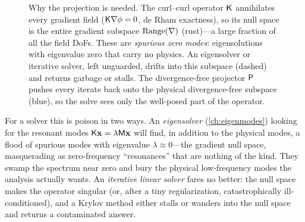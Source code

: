 \begin{figure}[t]
\centering
{}
\caption[The curl--curl gradient null space]{Why the projection is needed. The
curl--curl operator $\mathsf{K}$ annihilates every gradient field
($\mathsf{K}\nabla\phi=0$, de Rham exactness), so its null space is the entire
gradient subspace $\mathrm{Range}(\nabla)$ (rust)---a large fraction of all the
field DoFs. These are \emph{spurious zero modes}: eigensolutions with eigenvalue
zero that carry no physics. An eigensolver or iterative solver, left unguarded,
drifts into this subspace (dashed) and returns garbage or stalls. The
divergence-free projector $\mathsf{P}$ pushes every iterate back onto the physical
divergence-free subspace (blue), so the solve sees only the well-posed part of the
operator.}
\label{fig:nullspace}
\end{figure}

For a solver this is poison in two ways. An \emph{eigensolver}
(\cref{ch:eigenmodes}) looking for the resonant modes
$\mathsf{K}\mathbf{x}=\lambda\mathsf{M}\mathbf{x}$ will find, in addition to the physical modes, a
flood of spurious modes with eigenvalue $\lambda\approx 0$---the gradient null
space, masquerading as zero-frequency ``resonances'' that are nothing of the kind.
They swamp the spectrum near zero and bury the physical low-frequency modes the
analysis actually wants. An \emph{iterative linear solver} fares no better: the
null space makes the operator singular (or, after a tiny regularization,
catastrophically ill-conditioned), and a Krylov method either stalls or wanders
into the null space and returns a contaminated answer.

